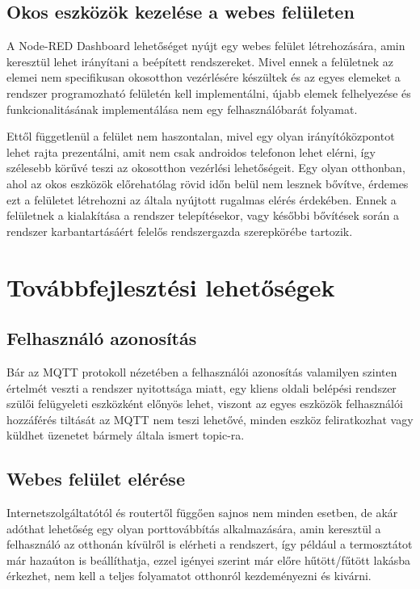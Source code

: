 \documentclass[]{thesis-ekf}
\theoremstyle{definition}
\theoremstyle{remark}
\begin{document}
\section{Okos eszközök kezelése a webes felületen}
A Node-RED Dashboard lehetőséget nyújt egy webes felület létrehozására, amin keresztül lehet irányítani a beépített
rendszereket. Mivel ennek a felületnek az elemei nem specifikusan okosotthon vezérlésére készültek és az egyes
elemeket a rendszer programozható felületén kell implementálni, újabb elemek felhelyezése és funkcionalitásának
implementálása nem egy felhasználóbarát folyamat.

Ettől függetlenül a felület nem haszontalan, mivel egy olyan irányítóközpontot lehet rajta prezentálni, amit nem csak
androidos telefonon lehet elérni, így szélesebb körűvé teszi az okosotthon vezérlési lehetőségeit. Egy olyan otthonban,
ahol az okos eszközök előrehatólag rövid időn belül nem lesznek bővítve, érdemes ezt a felületet létrehozni az
általa nyújtott rugalmas elérés érdekében. Ennek a felületnek a kialakítása a rendszer telepítésekor, vagy későbbi
bővítések során a rendszer karbantartásáért felelős rendszergazda szerepkörébe tartozik.

\chapter{Továbbfejlesztési lehetőségek}
\section{Felhasználó azonosítás}
Bár az MQTT protokoll nézetében a felhasználói azonosítás valamilyen szinten értelmét veszti
a rendszer nyitottsága miatt, egy kliens oldali belépési rendszer szülői felügyeleti
eszközként előnyös lehet, viszont az egyes eszközök felhasználói hozzáférés tiltását az MQTT
nem teszi lehetővé, minden eszköz feliratkozhat vagy küldhet üzenetet bármely általa ismert
topic-ra.

\section{Webes felület elérése}
Internetszolgáltatótól és routertől függően sajnos nem minden esetben, de akár adóthat lehetőség egy olyan
porttovábbítás alkalmazására, amin keresztül a felhasználó az otthonán kívülről is elérheti a rendszert,
így például a termosztátot már hazaúton is beállíthatja, ezzel igényei szerint már előre hűtött/fűtött lakásba
érkezhet, nem kell a teljes folyamatot otthonról kezdeményezni és kivárni.
\end{document}
